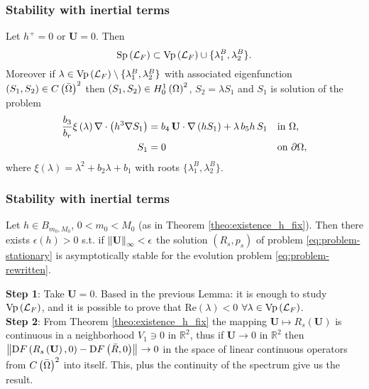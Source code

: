 \documentclass[10pt,aspectratio=169]{beamer}
\begin{document}
\begin{frame}
\frametitle{Stability with inertial terms}
\vspace*{0.5cm}
\begin{lemma}\label{lemma:spec-L_F}
	Let $h^+=0$ or $\mathbf{U}=0$. Then
	\begin{equation}
	\textnormal{Sp}\left(\mathcal{L}_F\right)\subset \textnormal{Vp}\left(\mathcal{L}_F\right)\cup \{\lambda_1^B,\lambda_2^B\}.
	\end{equation}
	Moreover if $\lambda\in \textnormal{Vp}\left(\mathcal{L}_F\right)\setminus\{\lambda_1^B,\lambda_2^B\}$ with associated eigenfunction $\left(S_1,S_2\right)\in C\left(\bar{\Omega}\right)^2$ then $\left(S_1,S_2\right)\in H^1_0\left(\Omega\right)^2$, $S_2=\lambda S_1$ and $S_1$ is solution of the problem
	\begin{align*}
	\frac{b_3}{b_r}\xi\left(\lambda\right)\nabla\cdot\left(h^3\nabla S_1\right)&=b_4\, \mathbf{U}\cdot\nabla\left(hS_1\right)+\lambda\, b_5 h\, S_1 && \textnormal{in }\Omega,\\
	S_1&=0&&\textnormal{on }\partial\Omega,
	\end{align*}
	where $\xi\left(\lambda\right)=\lambda^2+b_2\lambda+b_1$ with roots $\{\lambda_1^B,\lambda_2^B\}$.
\end{lemma}

\end{frame}


\begin{frame}
\frametitle{Stability with inertial terms}
\begin{theorem}\label{theo:stabilite-avec-inertie-h-fixe} Let $h\in B_{m_0,M_0}$, $0<m_0<M_0$ (as in Theorem \ref{theo:existence_h_fix}). Then there exists $\epsilon\left(h\right)>0$ s.t. if $\left\lVert\mathbf{U}\right\rVert_{\infty}<\epsilon$ the solution $\left(R_s,p_s\right)$ of problem \eqref{eq:problem-stationary} is asymptotically stable for the evolution problem \eqref{eq:problem-rewritten}.
\end{theorem}\bigskip
\textbf{Step 1}: Take $\mathbf{U}=0$. Based in the previous Lemma: it is enough to study $\textnormal{Vp}\left(\mathcal{L}_F\right)$, and it is possible to prove that  $\mbox{Re}\left(\lambda\right)<0$ $\forall \lambda \in \textnormal{Vp}\left(\mathcal{L}_F\right)$.\\ \bigskip
\textbf{Step 2}: From Theorem \ref{theo:existence_h_fix} the mapping $\mathbf{U}\mapsto R_s\left(\mathbf{U}\right)$ is continuous in a neighborhood $V_1\ni 0$ in $\mathbb{R}^2$, thus if $\mathbf{U}\rightarrow 0$ in $\mathbb{R}^2$ then $\left\lVert\textnormal{D}F\left(R_s\left(\mathbf{U}\right),0\right)-\textnormal{D}F\left(\bar{R},0\right)\right\rVert_{}\rightarrow 0$ in the space of linear continuous operators from $C\left(\bar{\Omega}\right)^2$ into itself. This, plus the continuity of the spectrum give us the result.
\end{frame}
\end{document}
